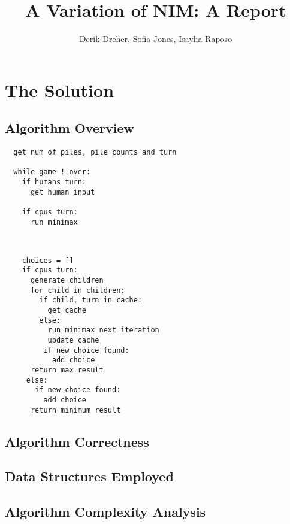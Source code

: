 \documentclass{article}
\begin{document}
\begin{titlepage}
\title{A Variation of NIM: A Report}
\author{Derik Dreher, Sofia Jones, Isayha Raposo}
\maketitle
\thispagestyle{empty}
\end{titlepage}

\rhead{\today}

\section*{The Solution}
\subsection*{Algorithm Overview}


\begin{verbatim}
  get num of piles, pile counts and turn
  
  while game ! over:
    if humans turn:
      get human input
      
    if cpus turn: 
      run minimax
      
    
\end{verbatim}

\begin{verbatim}
    choices = []
    if cpus turn: 
      generate children
      for child in children:
        if child, turn in cache:
          get cache
        else: 
          run minimax next iteration
          update cache
         if new choice found:
           add choice
      return max result
     else:
       if new choice found:
         add choice
      return minimum result
\end{verbatim}

\subsection*{Algorithm Correctness}
\subsection*{Data Structures Employed}
\subsection*{Algorithm Complexity Analysis}
\end{document}

